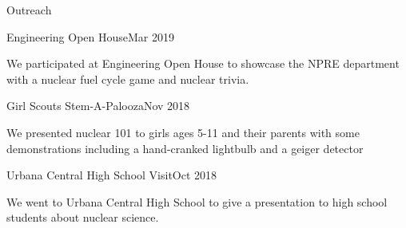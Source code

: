 \documentclass{resume2} %
\begin{document}
\begin{rSection}{Outreach}
\begin{rSubsection}{Engineering Open House}{Mar 2019}{}{}
		\item We participated at Engineering Open House to showcase
		the NPRE department with a nuclear fuel cycle game and nuclear trivia.
	\end{rSubsection}
	\begin{rSubsection}{Girl Scouts Stem-A-Palooza}{Nov 2018}{}{}
		\item We presented nuclear 101 to girls ages 5-11 and their parents with some demonstrations including a hand-cranked lightbulb   		and a geiger detector
	\end{rSubsection}
	\pagebreak
	\begin{rSubsection}{Urbana Central High School Visit}{Oct 2018}{}{}
		\item We went to Urbana Central High School to give a presentation
		to high school students about nuclear science.
	\end{rSubsection}
\end{rSection}
\end{document}
